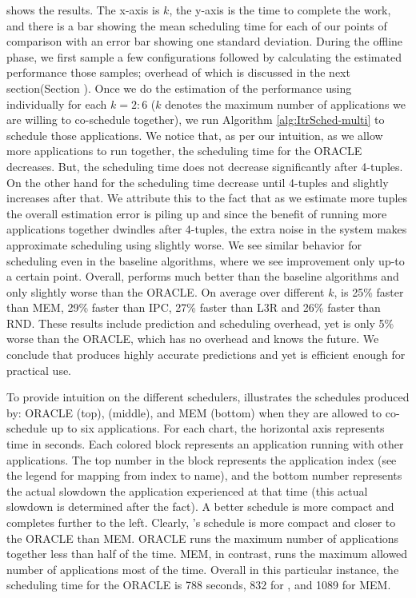  shows the results. The x-axis is
$k$, the y-axis is the time to complete the work, and there is a bar
showing the mean scheduling time for each of our points of comparison
with an error bar showing one standard deviation.
During the offline phase, we first sample a few configurations
followed by calculating the estimated performance those samples;
overhead of which is discussed in the next section(Section
). Once we do the estimation of the performance
using \SYSTEM{} individually for each $k = 2:6$ ($k$ denotes the
maximum number of applications we are willing to co-schedule
together), we run Algorithm \ref{alg:ItrSched-multi} to schedule those
applications. We notice that, as per our intuition, as we allow more
applications to run together, the scheduling time for the ORACLE
decreases. But, the scheduling time does not decrease significantly
after 4-tuples. On the other hand for \SYSTEM{} the scheduling time
decrease until 4-tuples and slightly increases after that. We
attribute this to the fact that as we estimate more tuples the overall
estimation error is piling up and since the benefit of running more
applications together dwindles after 4-tuples, the extra noise in the
system makes approximate scheduling using \SYSTEM{} slightly worse. We
see similar behavior for scheduling even in the baseline algorithms,
where we see improvement only up-to a certain point.
Overall, \SYSTEM{} performs much better than the baseline algorithms
and only slightly worse than the ORACLE. On average over different
$k$, \SYSTEM{} is 25\% faster than MEM, 29\% faster than IPC, 27\%
faster than L3R and 26\% faster than RND.  These results include
prediction and scheduling overhead, yet \SYSTEM{} is only 5\% worse
than the ORACLE, which has no overhead and knows the future.  We
conclude that \SYSTEM{} produces highly accurate predictions and yet
is efficient enough for practical use.


To provide intuition on the different schedulers,
 illustrates the schedules produced by: ORACLE
(top), \SYSTEM{} (middle), and MEM (bottom) when they are allowed to
co-schedule up to six applications.  For each chart, the horizontal
axis represents time in seconds. Each colored block represents an
application running with other applications. The top number in the
block represents the application index (see the legend for mapping
from index to name), and the bottom number represents the actual
slowdown the application experienced at that time (this actual
slowdown is determined after the fact).  A better schedule is more
compact and completes further to the left.  Clearly, \SYSTEM{}'s
schedule is more compact and closer to the ORACLE than MEM.  ORACLE
runs the maximum number of applications together less than half of the
time.  MEM, in contrast, runs the maximum allowed number of
applications most of the time. Overall in this particular instance,
the scheduling time for the ORACLE is 788 seconds, 832 for \SYSTEM{},
and 1089 for MEM.




